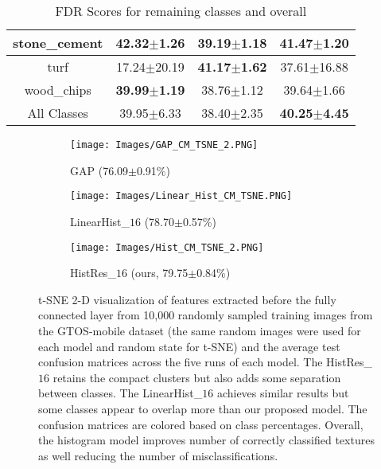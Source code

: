 \documentclass[journal]{IEEEtai}
\begin{document}
\begin{table*}[h]
\begin{subtable}[h]{.49\textwidth}
\begin{tabular}{|c|c|c|c|}
            stone\_cement    & \textbf{42.32$\pm$1.26}    & 39.19$\pm$1.18       & 41.47$\pm$1.20                       \\ \hline
            turf             & 17.24$\pm$20.19   & \textbf{41.17$\pm$1.62}           & {37.61$\pm$16.88}            \\ \hline
            wood\_chips      & {\textbf{39.99$\pm$1.19}} & 38.76$\pm$1.12 & 39.64$\pm$1.66 \\ \hline
            All Classes      & 39.95$\pm$6.33  & 38.40$\pm$2.35  & \textbf{40.25$\pm$4.45}  \\ \hline
        \end{tabular}
		\caption{FDR Scores for remaining classes and overall}
		\label{tab:FDR_B}
		\end{subtable}
		\label{tab:FDR_scores}
	\end{table*}
	
	    \begin{figure*}[htb]
    \centering \begin{subfigure}{.32\textwidth}{
				\texttt{[image: Images/GAP\_CM\_TSNE\_2.PNG]}
				\caption{GAP (76.09$\pm$0.91\%)}
				\label{fig:GAP_fig}
			}
		\end{subfigure}
		\begin{subfigure}{.32\textwidth}{
				\texttt{[image: Images/Linear\_Hist\_CM\_TSNE.PNG]}
				\caption{LinearHist\_$16$ (78.70$\pm$0.57\%)}
				\label{fig:Lin_fig}
			}
		\end{subfigure}
		\begin{subfigure}{.32\textwidth}{
				\texttt{[image: Images/Hist\_CM\_TSNE\_2.PNG]}
				\caption{HistRes\_$16$ (ours, 79.75$\pm$0.84\%)}
				\label{fig:Hist_fig}
			}
		\end{subfigure}
		
		\caption{t-SNE \cite{maaten2008visualizing} 2-D visualization of features extracted before the fully connected layer from 10,000 randomly sampled training images from the GTOS-mobile dataset (the same random images were used for each model and random state for t-SNE) and the average test confusion matrices across the five runs of each model. The HistRes\_$16$ retains the compact clusters but also adds some separation between classes. The LinearHist\_$16$ achieves similar results but some classes appear to overlap more than our proposed model. The confusion matrices are colored based on class percentages. Overall, the histogram model improves number of correctly classified textures as well reducing the number of misclassifications.}
		\centering
		\label{fig:CMTSNE_visual}
	\end{figure*}
	
\end{document}
